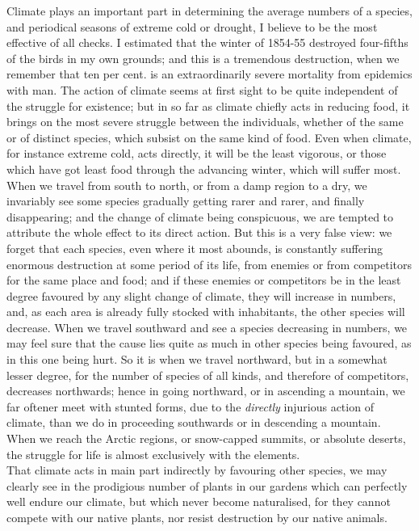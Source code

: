 \indent Climate plays an important part in determining the average numbers of a species, and periodical seasons of extreme cold or drought, I believe to be the most effective of all checks. I estimated that the winter of 1854-55 destroyed four-fifths of the birds in my own grounds; and this is a tremendous destruction, when we remember that ten per cent. is an extraordinarily severe mortality from epidemics with man. The action of climate seems at first sight to be quite independent of the struggle for existence; but in so far as climate chiefly acts in reducing food, it brings on the most severe struggle between the individuals, whether of the same or of distinct species, which subsist on the same kind of food. Even when climate, for instance extreme cold, acts directly, it will be the least vigorous, or those which have got least food through the advancing winter, which will suffer most. When we travel from south to north, or from a damp region to a dry, we invariably see some species gradually getting rarer and rarer, and finally disappearing; and the change of climate being conspicuous, we are tempted to attribute the whole effect to its direct action. But this is a very false view: we forget that each species, even where it most abounds, is constantly suffering enormous destruction at some period of its life, from enemies or from competitors for the same place and food; and if these enemies or competitors be in the least degree favoured by any slight change of climate, they will increase in numbers, and, as each area is already fully stocked with inhabitants, the other species will decrease. When we travel southward and see a species decreasing in numbers, we may feel sure that the cause lies quite as much in other species being favoured, as in this one being hurt. So it is when we travel northward, but in a somewhat lesser degree, for the number of species of all kinds, and therefore of competitors, decreases northwards; hence in going northward, or in ascending a mountain, we far oftener meet with stunted forms, due to the \emph{directly} injurious action of climate, than we do in proceeding southwards or in descending a mountain. When we reach the Arctic regions, or snow-capped summits, or absolute deserts, the struggle for life is almost exclusively with the elements.\\
\indent That climate acts in main part indirectly by favouring other species, we may clearly see in the prodigious number of plants in our gardens which can perfectly well endure our climate, but which never become naturalised, for they cannot compete with our native plants, nor resist destruction by our native animals.\\
